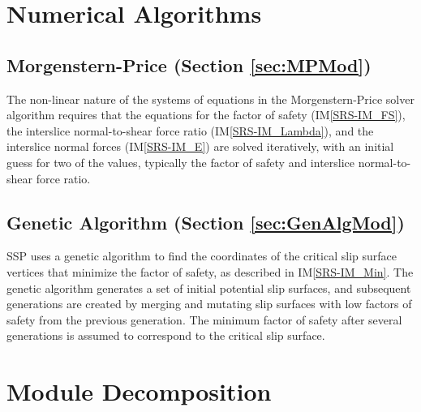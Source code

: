 \documentclass[12pt, titlepage]{article}
\newcommand{\progname}{SSP}
\begin{document}

\section{Numerical Algorithms}

\subsection*{Morgenstern-Price (Section \ref{sec:MPMod})}
The non-linear nature of the systems of equations in the Morgenstern-Price 
solver algorithm requires that the equations for
the factor of safety (IM\ref{SRS-IM_FS}), the interslice normal-to-shear force 
ratio (IM\ref{SRS-IM_Lambda}), and the interslice normal forces 
(IM\ref{SRS-IM_E}) are solved iteratively, with an initial guess for two of the 
values, typically the factor of safety and interslice normal-to-shear force 
ratio.

\subsection*{Genetic Algorithm (Section \ref{sec:GenAlgMod})}
\progname{} uses a genetic algorithm to find the coordinates of the
critical slip surface vertices that minimize the factor of safety, as described 
in IM\ref{SRS-IM_Min}. The genetic algorithm generates a set of initial 
potential slip surfaces, and subsequent generations are created by merging and 
mutating slip surfaces with low factors of safety from the previous generation. 
The minimum factor of safety after several generations is assumed to correspond 
to the critical slip surface.



\section{Module Decomposition}
\end{document}
